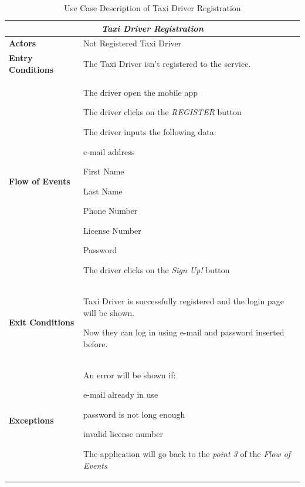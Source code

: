\documentclass[a4paper]{article}
\begin{document}
\begin{enumerate}[label=\bfseries G\arabic*:]
\begin{table} [H]
\begin{center}
\begin{tabular}{ |m{}|m{}|  }
\hline
    \multicolumn{2}{|c|}{\textbf{\textit{Taxi Driver Registration}}} \\
\hline \hline
    \textbf{Actors}
&   Not Registered Taxi Driver
\\ \hline
    \textbf{Entry Conditions}
&   The Taxi Driver isn't registered to the service.
\\ \hline
    \textbf{Flow of Events}
& 
    \begin{enumerate*}
    \item The driver open the mobile app
    \item The driver clicks on the \emph{REGISTER} button
    \item The driver inputs the following data:
        \begin{enumerate*}
        \item e-mail address
        \item First Name
        \item Last Name
        \item Phone Number
        \item License Number
        \item Password
        \end{enumerate*}
    \item The driver clicks on the \emph{Sign Up!} button
    \end{enumerate*}
\\ \hline
    \textbf{Exit Conditions}
&   Taxi Driver is successfully registered and the login page will be shown. 

    Now they can log in using e-mail and password inserted before.
\\ \hline
    \textbf{Exceptions}
&   
    An error will be shown if:
    \begin{itemize*}
    \item e-mail already in use
    \item password is not long enough
    \item invalid license number
    \end{itemize*}
    The application will go back to the \emph{point 3} of the \emph{Flow of Events} 
\\ \hline
\end{tabular}
\end{center}
\caption{Use Case Description of Taxi Driver Registration}
\label{table:taxiregistration}
\end{table}



\end{enumerate}
\end{document}
